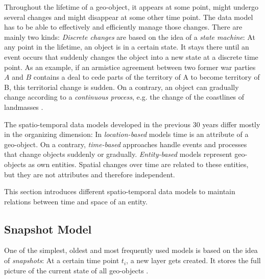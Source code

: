 Throughout the lifetime of a geo-object, it appears at some point, might undergo several changes and might disappear at some other time point. The data model has to be able to effectively and efficiently manage those changes. There are mainly two kinds: \emph{Discrete changes} are based on the idea of a \emph{state machine}: At any point in the lifetime, an object is in a certain state. It stays there until an event occurs that suddenly changes the object into a new state at a discrete time point. As an example, if an armistice agreement between two former war parties $A$ and $B$ contains a deal to cede parts of the territory of A to become territory of B, this territorial change is sudden. On a contrary, an object can gradually change according to a \emph{continuous process}, e.g. the change of the coastlines of landmasses
\cite{peuquet99}.

The spatio-temporal data models developed in the previous 30 years differ mostly in the organizing dimension: In \emph{location-based} models time is an attribute of a geo-object. On a contrary, \emph{time-based} approaches handle events and processes that change objects suddenly or gradually. \emph{Entity-based} models represent geo-objects as own entities. Spatial changes over time are related to these entities, but they are not attributes and therefore independent.



This section introduces different spatio-temporal data models to maintain relations between time and space of an entity.

\subsection{Snapshot Model} %
\label{sub:snapshot_model}

One of the simplest, oldest and most frequently used models is based on the idea of \emph{snapshots}: At a certain time point $t_i$, a new layer gets created. It stores the full picture of the current state of all geo-objects
\cite{Langran1988frameworktgis}.

